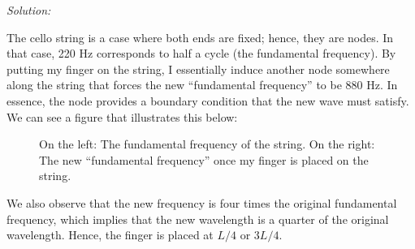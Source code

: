 \documentclass{article}
\begin{document}
\textit{Solution:}

\vspace{1em}

The cello string is a case where both ends are fixed; hence, they are nodes. In that case, 220 Hz corresponds to half a cycle (the fundamental frequency). By putting my finger on the string, I essentially induce another node somewhere along the string that forces the new ``fundamental frequency'' to be 880 Hz. In essence, the node provides a boundary condition that the new wave must satisfy. We can see a figure that illustrates this below:

\vspace{1cm}

\begin{figure}[h!]
    \centering
    \begin{minipage}{0.4\textwidth}
    \end{minipage}
    \hfill
    \begin{minipage}{0.4\textwidth}
    \end{minipage}
    \caption{On the left: The fundamental frequency of the string. On the right: The new ``fundamental frequency'' once my finger is placed on the string.}
\end{figure}

\vspace{1em}

We also observe that the new frequency is four times the original fundamental frequency, which implies that the new wavelength is a quarter of the original wavelength. Hence, the finger is placed at $L/4$ or $3L/4$.

\newpage
\end{document}
